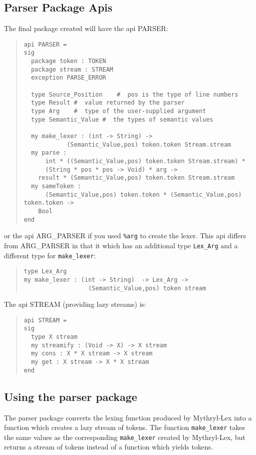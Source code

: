 \subsection{Parser Package Apis}
The final package created will have the api PARSER:
\begin{quote}
\begin{verbatim}
api PARSER =
sig
  package token : TOKEN
  package stream : STREAM
  exception PARSE_ERROR

  type Source_Position    #  pos is the type of line numbers 
  type Result #  value returned by the parser 
  type Arg    #  type of the user-supplied argument  
  type Semantic_Value #  the types of semantic values 

  my make_lexer : (int -> String) ->
		    (Semantic_Value,pos) token.token Stream.stream
  my parse :
      int * ((Semantic_Value,pos) token.token Stream.stream) *
      (String * pos * pos -> Void) * arg ->
	result * (Semantic_Value,pos) token.token Stream.stream
  my sameToken :
      (Semantic_Value,pos) token.token * (Semantic_Value,pos) token.token ->
	Bool
end
\end{verbatim}
\end{quote}
or the api ARG\_PARSER if you used {\tt \%arg} to create the lexer.
This api differs from ARG\_PARSER in that it
which has an additional type {\tt Lex_Arg} and a different type
for {\tt make_lexer}:
\begin{quote}
\begin{verbatim}
type Lex_Arg
my make_lexer : (int -> String)  -> Lex_Arg ->
                  (Semantic_Value,pos) token stream
\end{verbatim}
\end{quote}

The api STREAM (providing lazy streams) is:
\begin{quote}
\begin{verbatim}
api STREAM =
sig
  type X stream
  my streamify : (Void -> X) -> X stream
  my cons : X * X stream -> X stream
  my get : X stream -> X * X stream
end
\end{verbatim}
\end{quote}

\subsection{Using the parser package}

The parser package converts the lexing function produced by
Mythryl-Lex into a function which creates a lazy stream of tokens.  The
function {\tt make_lexer} takes the same values as the corresponding
{\tt make_lexer} created by Mythryl-Lex, but returns a stream of tokens
instead of a function which yields tokens.

